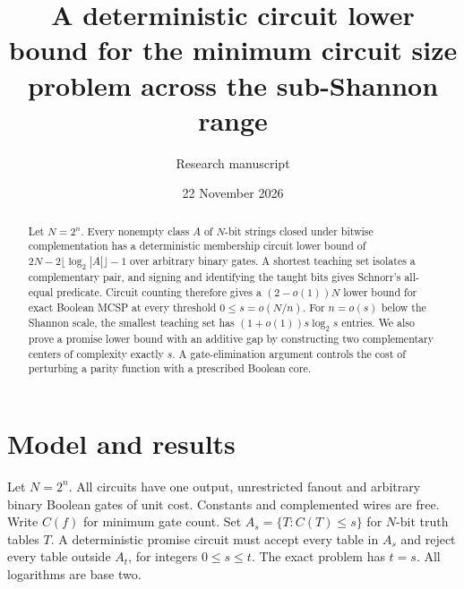 \documentclass[11pt]{article}
\title{A deterministic circuit lower bound for the minimum circuit size problem across the sub-Shannon range}
\author{Research manuscript}
\date{22 November 2026}
\begin{document}
\maketitle
\begin{abstract}
Let $N=2^n$. Every nonempty class $A$ of $N$-bit strings closed under bitwise complementation has a deterministic membership circuit lower bound of $2N-2\lfloor\log_2|A|\rfloor-1$ over arbitrary binary gates. A shortest teaching set isolates a complementary pair, and signing and identifying the taught bits gives Schnorr's all-equal predicate. Circuit counting therefore gives a $(2-o(1))N$ lower bound for exact Boolean MCSP at every threshold $0\le s=o(N/n)$. For $n=o(s)$ below the Shannon scale, the smallest teaching set has $(1+o(1))s\log_2s$ entries. We also prove a promise lower bound with an additive gap by constructing two complementary centers of complexity exactly $s$. A gate-elimination argument controls the cost of perturbing a parity function with a prescribed Boolean core.
\end{abstract}
\section{Model and results}
Let $N=2^n$. All circuits have one output, unrestricted fanout and arbitrary binary Boolean gates of unit cost. Constants and complemented wires are free. Write $C(f)$ for minimum gate count. Set $A_s=\{T:C(T)\le s\}$ for $N$-bit truth tables $T$. A deterministic promise circuit must accept every table in $A_s$ and reject every table outside $A_t$, for integers $0\le s\le t$. The exact problem has $t=s$. All logarithms are base two.
\end{document}
